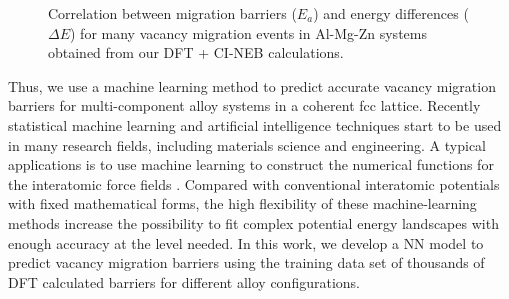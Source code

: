 \begingroup
\begin{figure}[!ht]
  \centering
\caption[Correlation between migration barriers ($E_a$) and energy differences ($\Delta E$) for many vacancy migration events in Al-Mg-Zn systems.]{Correlation between migration barriers ($E_a$) and energy differences ($\Delta E$) for many vacancy migration events in Al-Mg-Zn systems obtained from our DFT +  \ac{CI-NEB} calculations.}
  \label{Chap:Al/Vac:fig2}
\end{figure}
\endgroup


Thus, we use a machine learning method to predict accurate vacancy migration barriers for multi-component alloy systems in a coherent fcc lattice. Recently statistical machine learning and artificial intelligence techniques start to be used in many research fields, including materials science and engineering. A typical applications is to use machine learning to construct the numerical functions for the interatomic force fields \cite{bartok2010gaussian,behler2011atom,szlachta2014accuracy,artrith2016implementation,mehta2014exact,artrith2017efficient}. Compared with conventional interatomic potentials with fixed mathematical forms, the high flexibility of these machine-learning methods increase the possibility to fit complex potential energy landscapes with enough accuracy at the level needed. In this work, we develop a \acf{NN} model to predict vacancy migration barriers using the training data set of thousands of \ac{DFT} calculated barriers for different alloy configurations. 


